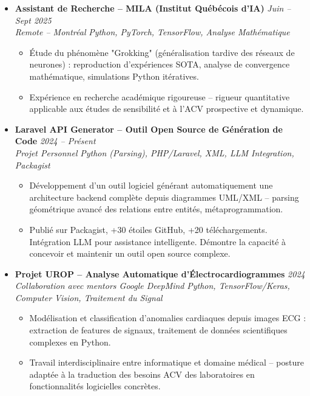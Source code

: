\documentclass[a4paper,11pt]{article}
\begin{document}
\begin{itemize}[leftmargin=*, label={-}]
\item \textbf{Assistant de Recherche -- MILA (Institut Québécois d'IA)} \hfill \textit{Juin -- Sept 2025} \\
\textit{Remote -- Montréal} \hfill \textit{Python, PyTorch, TensorFlow, Analyse Mathématique}
\vspace{-2pt}
    \begin{itemize}[leftmargin=0.4cm, nosep, label=\tiny$\bullet$]
        \item \small{Étude du phénomène "Grokking" (généralisation tardive des réseaux de neurones) : reproduction d'expériences SOTA, analyse de convergence mathématique, simulations Python itératives.}
        \item \small{Expérience en recherche académique rigoureuse -- rigueur quantitative applicable aux études de sensibilité et à l'ACV prospective et dynamique.}
    \end{itemize}
\vspace{3pt}

\item \textbf{Laravel API Generator -- Outil Open Source de Génération de Code} \hfill \textit{2024 -- Présent} \\
\textit{Projet Personnel} \hfill \textit{Python (Parsing), PHP/Laravel, XML, LLM Integration, Packagist}
\vspace{-2pt}
    \begin{itemize}[leftmargin=0.4cm, nosep, label=\tiny$\bullet$]
        \item \small{Développement d'un outil logiciel générant automatiquement une architecture backend complète depuis diagrammes UML/XML -- parsing géométrique avancé des relations entre entités, métaprogrammation.}
        \item \small{Publié sur Packagist, +30 étoiles GitHub, +20 téléchargements. Intégration LLM pour assistance intelligente. Démontre la capacité à concevoir et maintenir un outil open source complexe.}
    \end{itemize}
\vspace{3pt}

\item \textbf{Projet UROP -- Analyse Automatique d'Électrocardiogrammes} \hfill \textit{2024} \\
\textit{Collaboration avec mentors Google DeepMind} \hfill \textit{Python, TensorFlow/Keras, Computer Vision, Traitement du Signal}
\vspace{-2pt}
    \begin{itemize}[leftmargin=0.4cm, nosep, label=\tiny$\bullet$]
        \item \small{Modélisation et classification d'anomalies cardiaques depuis images ECG : extraction de features de signaux, traitement de données scientifiques complexes en Python.}
        \item \small{Travail interdisciplinaire entre informatique et domaine médical -- posture adaptée à la traduction des besoins ACV des laboratoires en fonctionnalités logicielles concrètes.}
    \end{itemize}
\vspace{3pt}

\end{itemize}
\end{document}
